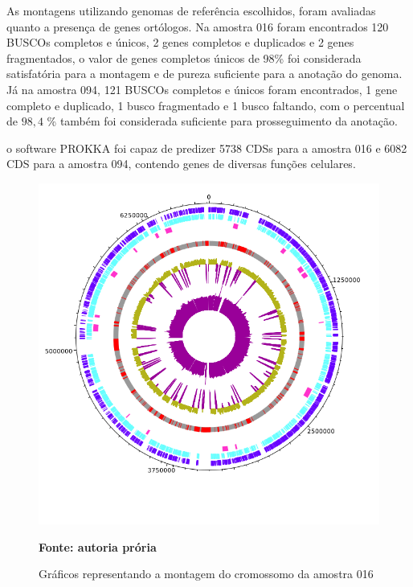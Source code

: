 As montagens utilizando genomas de referência escolhidos, foram avaliadas quanto a presença de genes 
ortólogos. Na amostra 016 foram encontrados 120 BUSCOs completos e únicos, 2 genes completos e duplicados e 2 genes fragmentados,
 o valor de genes completos únicos de 98\% foi considerada satisfatória para a montagem e de pureza suficiente para
a anotação do genoma. Já na amostra 094, 121 BUSCOs completos e únicos foram encontrados, 1 gene completo e duplicado, 1 busco fragmentado
e 1 busco faltando, com o percentual de $98,4$ \% também foi considerada suficiente para prosseguimento da anotação.

o software PROKKA foi capaz de predizer 5738 CDSs para a amostra 016 e 6082 CDS para a amostra 094, contendo genes
de diversas funções celulares. 

\begin{figure}[H]
	\caption{Gráficos representando a montagem do cromossomo da amostra 016}
	\label{fig:genoma16}
	\centering
	\includegraphics[width=0.8\linewidth]{imagens/genome/002.png} \\
	\centering
    \begin{small}\textbf{Fonte: autoria prória}\end{small}
\end{figure}
\vspace{\floatsep}

